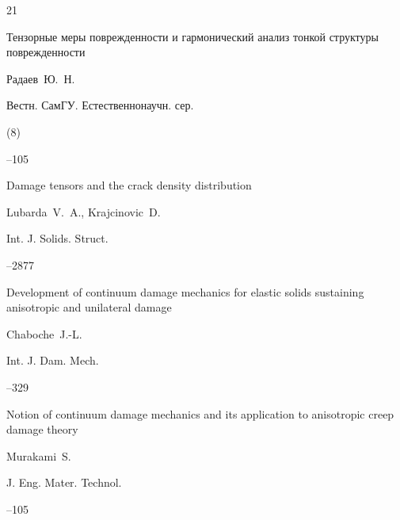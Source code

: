 \begin{thebibliography}{21}

\paper Тензорные меры поврежденности и гармонический анализ тонкой структуры поврежденности

\by Радаев~Ю.~Н.

\jour Вестн. СамГУ. Естественнонаучн. сер.


(8)

--105




\paper Damage tensors and the crack density distribution

\by Lubarda~V.~A., Krajcinovic~D.

\jour Int. J. Solids. Struct.




--2877







\paper Development of continuum damage mechanics for elastic solids sustaining anisotropic and unilateral damage

\by Chaboche~J.-L.

\jour Int. J. Dam. Mech.




--329





\paper Notion of continuum damage mechanics and its application to anisotropic creep damage theory

\by Murakami~S.

\jour  J. Eng. Mater. Technol.




--105






\end{thebibliography}

